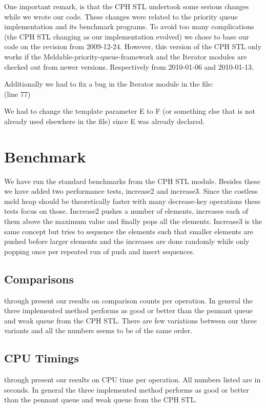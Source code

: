 \documentclass{DIKU-article}[2010/01/13]
\newcommand{\code}[1]{{\small\texttt{#1}}}
\begin{document}
One important remark, is that the CPH STL undertook some serious
changes while we wrote our code. These changes were related to the
priority queue implementation and its benchmark programs. To avoid too
many complications (the CPH STL changing as our implementation
evolved) we chose to base our code on the revision from
2009-12-24. However, this version of the CPH STL only works if the
Meldable-priority-queue-framework and the Iterator modules are checked
out from newer versions. Respectively from 2010-01-06 and 2010-01-13.

Additionally we had to fix a bug in the Iterator module in the file:\\
\indent \code{Iterator/Code/priority-queue-iterator.h++} (line 77)

We had to change the template parameter E to F (or something else that
is not already used elsewhere in the file) since E was already
declared.


\section{Benchmark}

We have run the standard benchmarks from the CPH STL module. Besides
these we have added two performance tests, increase2 and
increase3. Since the costless meld heap should be theoretically faster
with many decrease-key operations these tests focus on
those. Increase2 pushes a number of elements, increases each of them
above the maximum value and finally pops all the elements. Increase3
is the same concept but tries to sequence the elements such that
smaller elements are pushed before larger elements and the increases
are done randomly while only popping once per repeated run of push and
insert sequences.


\subsection{Comparisons}
 through  present our results
on comparison counts per operation. In general the three implemented
method performs as good or better than the pennant queue and weak
queue from the CPH STL. There are few variations between our three
variants and all the numbers seems to be of the same order.

\subsection{CPU Timings}
 through  present our results
on CPU time per operation. All numbers listed are in seconds. In
general the three implemented method performs as good or better than
the pennant queue and weak queue from the CPH STL.
\end{document}
